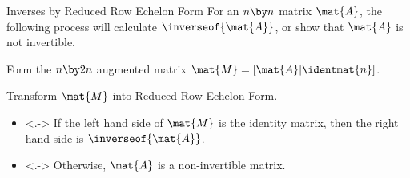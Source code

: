 \documentclass{beamer}
\begin{document}
\begin{frame}
\begin{block}{Inverses by Reduced Row Echelon Form}
For an $n\by n$ matrix $\mat{A}$, the following process will calculate $\inverseof{\mat{A}}$, or show that $\mat{A}$ is not invertible.
\onslide<+->
\begin{description}[<+- | alert@+>]
\item[Step 1:] Form the $n\by 2n$ augmented matrix $\mat{M}=[\mat{A}|\identmat{n}]$.
\item[Step 2:] Transform $\mat{M}$ into Reduced Row Echelon Form.
\item[Step 3:] 
\begin{itemize}
\item<.-> If the left hand side of $\mat{M}$ is the identity matrix, then the right hand side is $\inverseof{\mat{A}}$.
\item<.-> Otherwise, $\mat{A}$ is a non-invertible matrix.
\end{itemize}
\end{description}
\end{block}
\end{frame}
\end{document}
